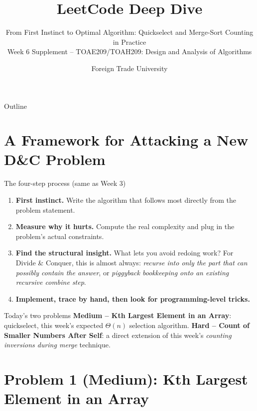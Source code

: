 \documentclass[11pt,aspectratio=169]{beamer}
\title{LeetCode Deep Dive}
\subtitle{From First Instinct to Optimal Algorithm: Quickselect and Merge-Sort Counting in
Practice\\
\small Week 6 Supplement -- TOAE209/TOAH209: Design and Analysis of Algorithms}
\author{Foreign Trade University}
\date{}
\begin{document}
\begin{frame}
  \titlepage
\end{frame}

\begin{frame}{Outline}
  \tableofcontents
\end{frame}

\section{A Framework for Attacking a New D\&C Problem}

\begin{frame}{The four-step process (same as Week 3)}
  \begin{enumerate}
    \item \textbf{First instinct.} Write the algorithm that follows most directly from
    the problem statement.
    \item \textbf{Measure why it hurts.} Compute the real complexity and plug in the
    problem's actual constraints.
    \item \textbf{Find the structural insight.} What lets you avoid redoing work? For
    Divide \& Conquer, this is almost always: \emph{recurse into only the part that can
    possibly contain the answer}, or \emph{piggyback bookkeeping onto an existing
    recursive combine step}.
    \item \textbf{Implement, trace by hand, then look for programming-level tricks.}
  \end{enumerate}
  \begin{alertblock}{Today's two problems}
    \textbf{Medium -- Kth Largest Element in an Array}: quickselect, this week's expected
    $\Theta(n)$ selection algorithm. \textbf{Hard -- Count of Smaller Numbers After Self}:
    a direct extension of this week's \emph{counting inversions during merge} technique.
  \end{alertblock}
\end{frame}

\section{Problem 1 (Medium): Kth Largest Element in an Array}
\end{document}
